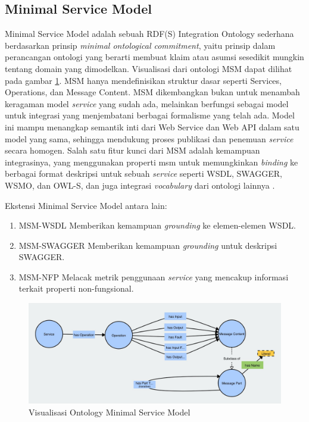 \subsection{Minimal Service Model}
\label{subsec:minimal-service-model}

Minimal Service Model adalah sebuah RDF(S) Integration Ontology sederhana berdasarkan prinsip \textit{minimal ontological commitment}, yaitu prinsip dalam perancangan ontologi yang berarti membuat klaim atau asumsi sesedikit mungkin tentang domain yang dimodelkan. Visualisasi dari ontologi MSM dapat dilihat pada gambar \ref{image:msm-visualization}. MSM hanya mendefinisikan struktur dasar seperti Services, Operations, dan Message Content. MSM dikembangkan bukan untuk menambah keragaman model \textit{service} yang sudah ada, melainkan berfungsi sebagai model untuk integrasi yang menjembatani berbagai formalisme yang telah ada. Model ini mampu menangkap semantik inti dari Web Service dan Web API dalam satu model yang sama, sehingga mendukung proses publikasi dan penemuan \textit{service} secara homogen. Salah satu fitur kunci dari MSM adalah kemampuan integrasinya, yang menggunakan properti msm untuk memungkinkan \textit{binding} ke berbagai format deskripsi untuk sebuah \textit{service} seperti WSDL, SWAGGER, WSMO, dan OWL-S, dan juga integrasi \textit{vocabulary} dari ontologi lainnya \parencite{iserve2015datamodel}.

Ekstensi Minimal Service Model antara lain:
\begin{enumerate}
	\item MSM-WSDL \break Memberikan kemampuan \textit{grounding} ke elemen-elemen WSDL.
	\item MSM-SWAGGER \break Memberikan kemampuan \textit{grounding} untuk deskripsi SWAGGER.
	\item MSM-NFP \break Melacak metrik penggunaan \textit{service} yang mencakup informasi terkait properti non-fungsional.
\end{enumerate}

\begin{figure}[ht]
	\centering
	\includegraphics[width=1\textwidth]{resources/chapter-2/msm-visualization.jpg}
	\caption{Visualisasi Ontology Minimal Service Model \parencite{third2017linked}}
	\label{image:msm-visualization}
\end{figure}